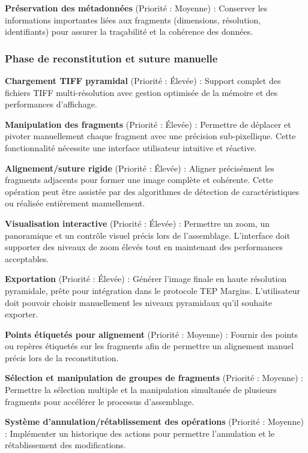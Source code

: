 \documentclass[12pt,a4paper]{report}
\begin{document}
\textbf{Préservation des métadonnées} (Priorité : Moyenne) : Conserver les informations importantes liées aux fragments (dimensions, résolution, identifiants) pour assurer la traçabilité et la cohérence des données.

\subsubsection{Phase de reconstitution et suture manuelle}

\textbf{Chargement TIFF pyramidal} (Priorité : Élevée) : Support complet des fichiers TIFF multi-résolution avec gestion optimisée de la mémoire et des performances d'affichage.

\textbf{Manipulation des fragments} (Priorité : Élevée) : Permettre de déplacer et pivoter manuellement chaque fragment avec une précision sub-pixellique. Cette fonctionnalité nécessite une interface utilisateur intuitive et réactive.

\textbf{Alignement/suture rigide} (Priorité : Élevée) : Aligner précisément les fragments adjacents pour former une image complète et cohérente. Cette opération peut être assistée par des algorithmes de détection de caractéristiques ou réalisée entièrement manuellement.

\textbf{Visualisation interactive} (Priorité : Élevée) : Permettre un zoom, un panoramique et un contrôle visuel précis lors de l'assemblage. L'interface doit supporter des niveaux de zoom élevés tout en maintenant des performances acceptables.

\textbf{Exportation} (Priorité : Élevée) : Générer l'image finale en haute résolution pyramidale, prête pour intégration dans le protocole TEP Margins. L'utilisateur doit pouvoir choisir manuellement les niveaux pyramidaux qu'il souhaite exporter.

\textbf{Points étiquetés pour alignement} (Priorité : Moyenne) : Fournir des points ou repères étiquetés sur les fragments afin de permettre un alignement manuel précis lors de la reconstitution.

\textbf{Sélection et manipulation de groupes de fragments} (Priorité : Moyenne) : Permettre la sélection multiple et la manipulation simultanée de plusieurs fragments pour accélérer le processus d'assemblage.

\textbf{Système d'annulation/rétablissement des opérations} (Priorité : Moyenne) : Implémenter un historique des actions pour permettre l'annulation et le rétablissement des modifications.
\end{document}
